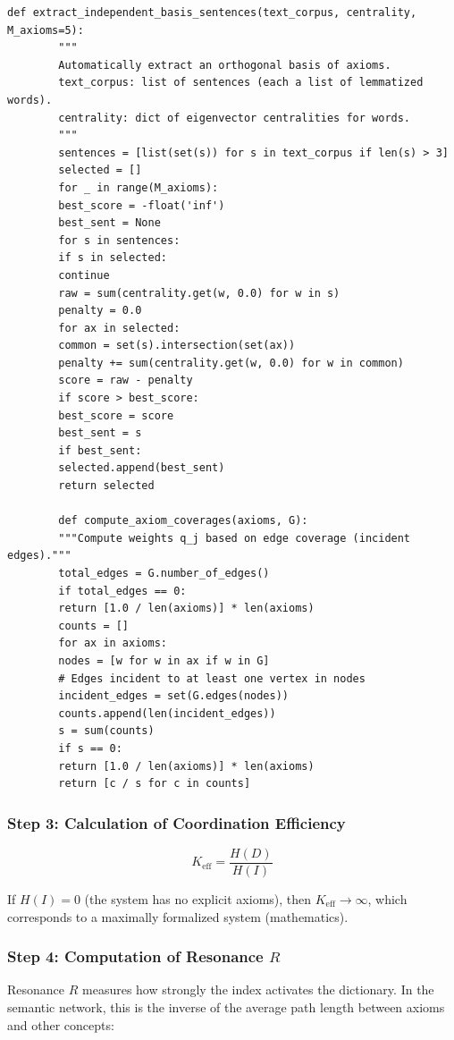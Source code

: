 \documentclass[12pt,a4paper]{article}
\begin{document}
	\begin{lstlisting}[caption={Function for extracting the independent basis of axioms}, label={lst:basis}]
		def extract_independent_basis_sentences(text_corpus, centrality, M_axioms=5):
		"""
		Automatically extract an orthogonal basis of axioms.
		text_corpus: list of sentences (each a list of lemmatized words).
		centrality: dict of eigenvector centralities for words.
		"""
		sentences = [list(set(s)) for s in text_corpus if len(s) > 3]
		selected = []
		for _ in range(M_axioms):
		best_score = -float('inf')
		best_sent = None
		for s in sentences:
		if s in selected:
		continue
		raw = sum(centrality.get(w, 0.0) for w in s)
		penalty = 0.0
		for ax in selected:
		common = set(s).intersection(set(ax))
		penalty += sum(centrality.get(w, 0.0) for w in common)
		score = raw - penalty
		if score > best_score:
		best_score = score
		best_sent = s
		if best_sent:
		selected.append(best_sent)
		return selected
		
		def compute_axiom_coverages(axioms, G):
		"""Compute weights q_j based on edge coverage (incident edges)."""
		total_edges = G.number_of_edges()
		if total_edges == 0:
		return [1.0 / len(axioms)] * len(axioms)
		counts = []
		for ax in axioms:
		nodes = [w for w in ax if w in G]
		# Edges incident to at least one vertex in nodes
		incident_edges = set(G.edges(nodes))
		counts.append(len(incident_edges))
		s = sum(counts)
		if s == 0:
		return [1.0 / len(axioms)] * len(axioms)
		return [c / s for c in counts]
	\end{lstlisting}
	
	\subsubsection{Step 3: Calculation of Coordination Efficiency}
	
	\[
	\boxed{
		K_{\mathrm{eff}} = \frac{H(D)}{H(I)}
	}
	\]
	
	If \(H(I) = 0\) (the system has no explicit axioms), then \(K_{\mathrm{eff}} \to \infty\), which corresponds to a maximally formalized system (mathematics).
	
	\subsubsection{Step 4: Computation of Resonance \(R\)}
	
	Resonance \(R\) measures how strongly the index activates the dictionary. In the semantic network, this is the inverse of the average path length between axioms and other concepts:
	
\end{document}
